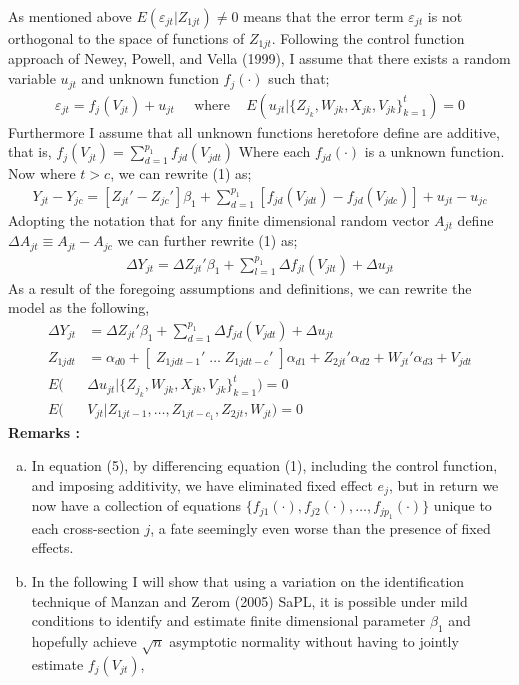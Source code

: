 \documentclass[10pt]{article}
\begin{document}
 \noindent 
As mentioned above $E(\varepsilon_{jt} | Z_{1jt} ) \neq 0$ means that the error term $\varepsilon_{jt}$ is not orthogonal to the space of functions of $Z_{1jt}$. Following the control function approach of Newey, Powell, and Vella (1999), I assume that there exists a random variable $u_{jt}$ and unknown function $f_j(\cdot)$ such that; 
 \begin{align*} 
 \varepsilon_{jt} = f_j(V_{jt}) + u_{jt}  \;\;\;\ \text{ where } \;\;\; E(u_{jt} | \{Z_{j_k},W_{jk},X_{jk},V_{jk} \}_{k=1}^t) = 0
 \end{align*}
 Furthermore I assume that all unknown functions heretofore define are additive, that is, $f_j(V_{jt}) = \sum_{d=1}^{p_1} f_{jd}(V_{jdt})$
%
Where each $f_{jd}(\cdot)$ is a unknown function. 
Now where $t>c$, we can rewrite (1) as;
\begin{align*} 
Y_{jt} - Y_{jc} = [ Z_{jt}' - Z_{jc}' ]\beta_1 +  \sum_{d=1}^{p_1} [ f_{jd}(V_{jdt}) - f_{jd}(V_{jdc})] + u_{jt} - u_{jc}
\end{align*}
Adopting the notation that for any finite dimensional random vector $A_{jt}$ define $\Delta A_{jt}  \equiv A_{jt} - A_{jc}$ we can further rewrite (1) as;
\begin{align*} 
\Delta Y_{jt} = \Delta Z_{jt}'\beta_1  + \sum_{l=1}^{p_1} \Delta f_{jl}(V_{jlt}) + \Delta u_{jt}
\end{align*}
As a result of the foregoing assumptions and definitions, we can rewrite the model as the following, 
\begin{align} 
\Delta Y_{jt} &= \Delta Z_{jt}'\beta_1 + \sum_{d=1}^{p_1} \Delta f_{jd}(V_{jdt}) + \Delta u_{jt} \\
%
Z_{1jdt} &= \alpha_{d0} + [\; Z_{1jdt-1}' \; \ldots \; Z_{1jdt-c}' \; ] \alpha_{d1} + Z_{2jt}' \alpha_{d2} + W_{jt}' \alpha_{d3} + V_{jdt} \tag{2d}\\
%
E(&\Delta u_{jt} | \{Z_{j_k},W_{jk},X_{jk},V_{jk} \}_{k=1}^t) = 0 \\
%
E(& V_{jt} | Z_{1jt-1},\ldots,Z_{1jt-c_1},Z_{2jt},W_{jt}) = 0 
%
\end{align}
%
\noindent \bf Remarks \rm:
\begin{enumerate}[a.)] 
    \item In equation (5), by differencing equation (1), including the control function, and imposing additivity, we have eliminated fixed effect $e_j$, but in return we now have a collection of equations $\{f_{j1}(\cdot),f_{j2}(\cdot), \ldots , f_{jp_1}(\cdot)\}$ unique to each cross-section $j$, a fate seemingly even worse than the presence of fixed effects. 
    \item In the following I will show that using a variation on the identification technique of Manzan and Zerom (2005) SaPL, it is possible under mild conditions to identify and estimate finite dimensional parameter $\beta_1$  and hopefully achieve $\sqrt{n}$ asymptotic normality  without having to jointly estimate $f_j(V_{jt})$,  
\end{enumerate}
\end{document}
